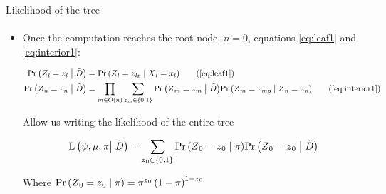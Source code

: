 \documentclass[9pt,ignorenonframetext,]{beamer}
\newcommand{\Prcond}[2]{{\mbox{Pr}\left(#1\vphantom{#2}\;\right|\left.\vphantom{#1}#2\right)}}
\newcommand{\likelihood}[2]{\mbox{L}\left(#1\vphantom{#2}\right|\left.\vphantom{#1}#2\right)}
\newcommand{\aphylo}{D{}}      %
\newcommand{\aphyloObs}{\tilde \aphylo{}} %
\newcommand{\Ann}{Z{}} %
\newcommand{\ann}{z{}} %
\newcommand{\AnnObs}{X{}}
\newcommand{\annObs}{x{}}
\begin{document}
\begin{frame}[t,label=likelihood]{Likelihood of the tree}

\framesubtitle{\hyperlink{peelingalgorithm}{}}

\begin{itemize}
\item
  Once the computation reaches the root node, \(n=0\), equations
  \eqref{eq:leaf1} and \eqref{eq:interior1}:

  \tiny

  \begin{align*}
  \Prcond{\Ann_l = \ann_l}{\aphyloObs} & = \Prcond{\Ann_{l} = \ann_{lp}}{\AnnObs_{l} = \annObs_{l}} \tag{\ref{eq:leaf1}}\\
  \Prcond{\Ann_n = \ann_n}{\aphyloObs}  & = 
  \prod_{m \in O(n)} \sum_{\ann_m \in \{0,1\}} \Prcond{\Ann_m = \ann_m}{\aphyloObs}  
  \Prcond{\Ann_{m} = \ann_{mp}}{\Ann_{n} = \ann_{n}} \tag{\ref{eq:interior1}}
  \end{align*}

  \normalsize

  Allow us writing the likelihood of the entire tree

  \begin{equation}
  \label{eq:l}
  \likelihood{\psi, \mu, \pi}{\aphyloObs} = \sum_{\ann_0\in\{0,1\}}\Prcond{\Ann_0=\ann_0}{\pi}\Prcond{\Ann_0=\ann_0}{\aphyloObs}
  \end{equation}

  Where
  \(\Prcond{\Ann_0=\ann_0}{\pi} = \pi^{\ann_{0}}\left(1 - \pi\right)^{1 - \ann_{0}}\)
\end{itemize}

\end{frame}
\end{document}
